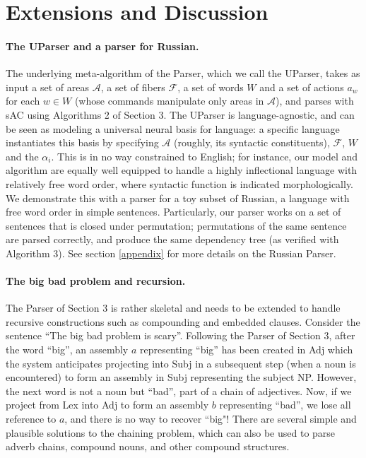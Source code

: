 \documentclass[11pt,a4paper]{article}
\begin{document}
\section{Extensions and Discussion} \label{extensions}
\paragraph{The UParser and a parser for Russian.}
The underlying meta-algorithm of the Parser, which we call the UParser, takes as input a set of areas $\mathcal{A}$, a set of fibers $\mathcal{F}$, a set of words $W$ and a set of actions $a_w$ for each $w \in W$ (whose commands manipulate only areas in $\mathcal{A}$), and parses with sAC using Algorithms 2 of Section 3. The UParser is language-agnostic, and can be seen as modeling a universal neural basis for language: a specific language instantiates this basis by specifying $\mathcal{A}$ (roughly, its syntactic constituents), $\mathcal{F}$, $W$ and the $\alpha_i$. This is in no way constrained to English; for instance, our model and algorithm are equally well equipped to handle a highly inflectional language with relatively free word order, where syntactic function is indicated morphologically. We demonstrate this with a parser for a toy subset of Russian, a language with free word order in  simple sentences. Particularly, our parser works on a set of sentences that is closed under permutation; permutations of the same sentence are parsed correctly, and produce the same dependency tree (as verified with Algorithm 3). See section \ref{appendix} for more details on the Russian Parser. 

\paragraph{The big bad problem and recursion.}
The Parser of Section 3 is rather skeletal and needs to be extended to handle recursive constructions such as compounding and embedded clauses. Consider the sentence “The big bad problem is scary”. Following the Parser of Section 3, after the word “big”, an assembly $a$ representing “big” has been created in {\sc Adj} which the system anticipates projecting into {\sc Subj} in a subsequent step (when a noun is encountered) to form an assembly in {\sc Subj} representing the subject NP. However, the next word is not a noun but “bad”, part of a chain of adjectives. Now, if we project from {\sc Lex} into {\sc Adj} to form an assembly $b$ representing “bad”, we lose all reference to $a$, and there is no way to recover ``big"! There are several simple and plausible solutions to the chaining problem, which can also be used to parse adverb chains, compound nouns, and other compound structures. 
\end{document}
